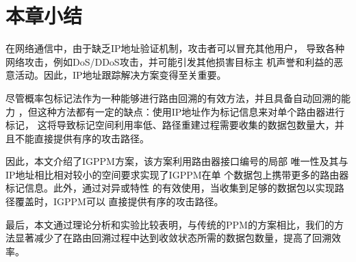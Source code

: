 \section{本章小结}
\label{sec:otherparts}
在网络通信中，由于缺乏IP地址验证机制，攻击者可以冒充其他用户，
导致各种网络攻击，例如DoS/DDoS攻击，并可能引发其他损害目标主
机声誉和利益的恶意活动。因此，IP地址跟踪解决方案变得至关重要。

尽管概率包标记法作为一种能够进行路由回溯的有效方法，并且具备自动回溯的能力
，但这种方法都有一定的缺点：使用IP地址作为标记信息来对单个路由器进行标记，
这将导致标记空间利用率低、路径重建过程需要收集的数据包数量大，并且不能直接提供有序的攻击路径。

因此，本文介绍了IGPPM方案，该方案利用路由器接口编号的局部
唯一性及其与IP地址相比相对较小的空间要求实现了IGPPM在单
个数据包上携带更多的路由器标记信息。此外，通过对异或特性
的有效使用，当收集到足够的数据包以实现路径覆盖时，IGPPM可以
直接提供有序的攻击路径。

最后，本文通过理论分析和实验比较表明，与传统的PPM的方案相比，我们的方法显著减少了在路由回溯过程中达到收敛状态所需的数据包数量，提高了回溯效率。
